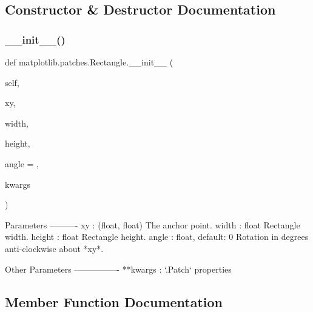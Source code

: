 \subsection{Constructor \& Destructor Documentation}
\mbox{\label{classmatplotlib_1_1patches_1_1Rectangle_a7d63154bd2a86b5e8e314a12c7728877}} 
\subsubsection{\texorpdfstring{\+\_\+\+\_\+init\+\_\+\+\_\+()}{\_\_init\_\_()}}
{\footnotesize\ttfamily def matplotlib.\+patches.\+Rectangle.\+\_\+\+\_\+init\+\_\+\+\_\+ (\begin{DoxyParamCaption}\item[{}]{self,  }\item[{}]{xy,  }\item[{}]{width,  }\item[{}]{height,  }\item[{}]{angle = {},  }\item[{}]{kwargs }\end{DoxyParamCaption})}

\begin{DoxyVerb}Parameters
----------
xy : (float, float)
    The anchor point.
width : float
    Rectangle width.
height : float
    Rectangle height.
angle : float, default: 0
    Rotation in degrees anti-clockwise about *xy*.

Other Parameters
----------------
**kwargs : `.Patch` properties
\end{DoxyVerb}
 

\subsection{Member Function Documentation}
\mbox{\label{classmatplotlib_1_1patches_1_1Rectangle_a5407eda04219c5c82d48378763b5eb33}} 
